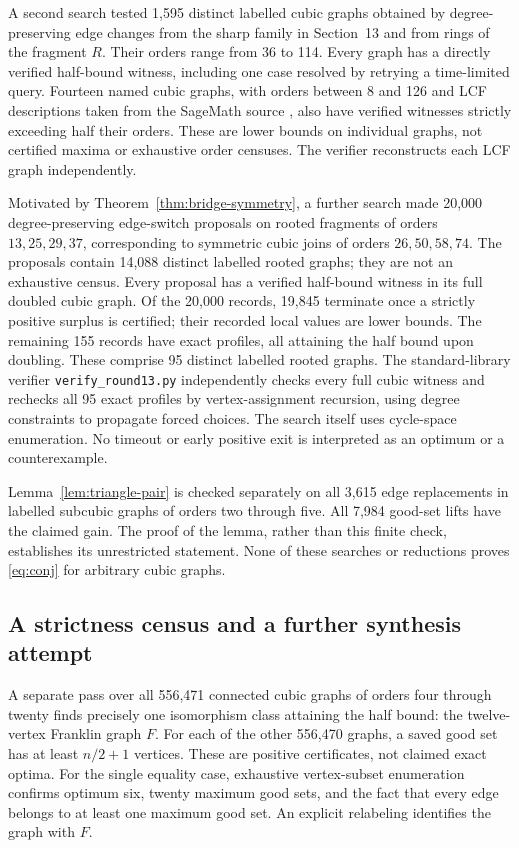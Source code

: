 \documentclass[11pt]{article}
\begin{document}
A second search tested 1,595 distinct labelled cubic graphs obtained
by degree-preserving edge changes from the sharp family in Section~13
and from rings of the fragment $R$. Their orders range from 36 to 114.
Every graph has a directly verified half-bound witness, including one
case resolved by retrying a time-limited query. Fourteen named cubic
graphs, with orders between 8 and 126 and LCF descriptions taken
from the SageMath source \cite{Sage}, also have verified witnesses
strictly exceeding half their orders. These are lower bounds on
individual graphs, not certified maxima or exhaustive order censuses.
The verifier reconstructs each LCF graph independently.

Motivated by Theorem~\ref{thm:bridge-symmetry}, a further search made
20,000 degree-preserving edge-switch proposals on rooted fragments
of orders $13,25,29,37$, corresponding to symmetric cubic joins of
orders $26,50,58,74$. The proposals contain 14,088 distinct labelled
rooted graphs; they are not an exhaustive census. Every proposal
has a verified half-bound witness in its full doubled cubic graph.
Of the 20,000 records, 19,845 terminate once a strictly positive
surplus is certified; their recorded local values are lower bounds.
The remaining 155 records have exact profiles, all attaining the
half bound upon doubling. These comprise 95 distinct labelled
rooted graphs. The standard-library verifier
\texttt{verify\_round13.py} independently checks every full cubic
witness and rechecks all 95 exact profiles by vertex-assignment
recursion, using degree constraints to propagate forced choices.
The search itself uses cycle-space enumeration. No timeout or
early positive exit is interpreted as an optimum or a counterexample.

Lemma~\ref{lem:triangle-pair} is checked separately on all 3,615
edge replacements in labelled subcubic graphs of orders two through
five. All 7,984 good-set lifts have the claimed gain. The proof of
the lemma, rather than this finite check, establishes its unrestricted
statement. None of these searches or reductions proves
\eqref{eq:conj} for arbitrary cubic graphs.

\subsection{A strictness census and a further synthesis attempt}
A separate pass over all 556,471 connected cubic graphs of orders
four through twenty finds precisely one isomorphism class attaining
the half bound: the twelve-vertex Franklin graph $F$. For each of
the other 556,470 graphs, a saved good set has at least $n/2+1$
vertices. These are positive certificates, not claimed exact optima.
For the single equality case, exhaustive vertex-subset enumeration
confirms optimum six, twenty maximum good sets, and the fact that
every edge belongs to at least one maximum good set. An explicit
relabeling identifies the graph with $F$.
\end{document}
